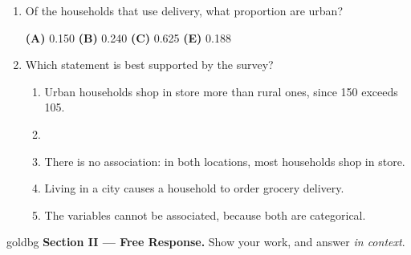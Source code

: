\documentclass[12pt]{article}
\begin{document}
\begin{enumerate}[leftmargin=1.9em, itemsep=0.08in]

  \item Of the households that use delivery, what proportion are urban?
        \hfill{}\rule[-0.2in]{0pt}{0.48in}
        \par\vspace{3pt}
        \hspace*{1.2em}\textbf{(A)} 0.150 \hfill \textbf{(B)} 0.240 \hfill \textbf{(C)} 0.625
        \hfill {} \hfill \textbf{(E)} 0.188 \hspace*{1.2em}

  \item Which statement is best supported by the survey?
        \begin{enumerate}[label=\textbf{(\Alph*)}, leftmargin=2.2em, itemsep=0pt]
          \item Urban households shop in store more than rural ones, since 150 exceeds 105.
          \item {}
          \item There is no association: in both locations, most households shop in store.
          \item Living in a city causes a household to order grocery delivery.
          \item The variables cannot be associated, because both are categorical.
                \hfill{}\rule[-0.2in]{0pt}{0.48in}
        \end{enumerate}

\end{enumerate}

\vspace{0.06in}

\boxguard[22]
\begin{headlinebox}{goldbg}
\small
\textbf{Section II --- Free Response.} Show your work, and answer \emph{in context}.
\end{headlinebox}

\vspace{0.04in}
\end{document}
